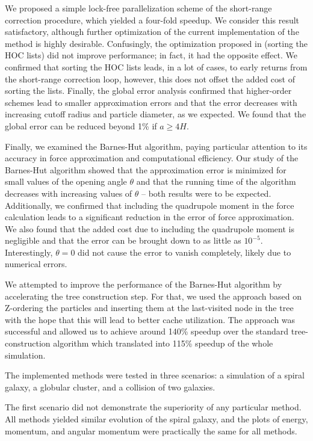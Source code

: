 We proposed a simple lock-free parallelization scheme of the short-range correction procedure, which yielded a four-fold speedup.
We consider this result satisfactory, although further optimization of the current implementation of the \PThreeM{} method is highly desirable.
Confusingly, the optimization proposed in \cite{Hockney1988} (sorting the HOC lists) did not improve performance; in fact, it had the opposite effect.
We confirmed that sorting the HOC lists leads, in a lot of cases, to early returns from the short-range correction loop, however, this does not offset the added cost of sorting the lists.
Finally, the global error analysis confirmed that higher-order schemes lead to smaller approximation errors and that the error decreases with increasing cutoff radius and particle diameter, as we expected.
We found that the global error can be reduced beyond 1\% if $a \geq 4 H$.

Finally, we examined the Barnes-Hut algorithm, paying particular attention to its accuracy in force approximation and computational efficiency.
Our study of the Barnes-Hut algorithm showed that the approximation error is minimized for small values of the opening angle $\theta$ and that the running time of the algorithm decreases with increasing values of $\theta$ -- both results were to be expected.
Additionally, we confirmed that including the quadrupole moment in the force calculation leads to a significant reduction in the error of force approximation.
We also found that the added cost due to including the quadrupole moment is negligible and that the error can be brought down to as little as $10^{-5}$.
Interestingly, $\theta = 0$ did not cause the error to vanish completely, likely due to numerical errors.

We attempted to improve the performance of the Barnes-Hut algorithm by accelerating the tree construction step.
For that, we used the approach based on Z-ordering the particles and inserting them at the last-visited node in the tree with the hope that this will lead to better cache utilization.
The approach was successful and allowed us to achieve around 140\% speedup over the standard tree-construction algorithm which translated into 115\% speedup of the whole simulation.

The implemented methods were tested in three scenarios: a simulation of a spiral galaxy, a globular cluster, and a collision of two galaxies.

The first scenario did not demonstrate the superiority of any particular method.
All methods yielded similar evolution of the spiral galaxy, and the plots of energy, momentum, and angular momentum were practically the same for all methods.

